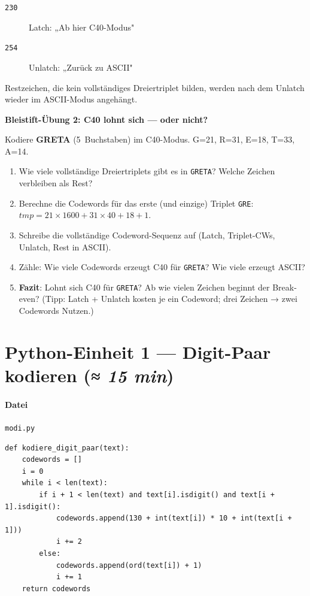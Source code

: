 \begin{description}
\item[\texttt{230}] Latch: „Ab hier C40-Modus"
\item[\texttt{254}] Unlatch: „Zurück zu ASCII"
\end{description}

Restzeichen, die kein vollständiges Dreiertriplet bilden, werden nach
dem Unlatch wieder im ASCII-Modus angehängt.

\begin{bleistiftuebung}
\textbf{Bleistift-Übung 2: C40 lohnt sich — oder nicht?}

Kodiere \textbf{GRETA} (5~Buchstaben) im C40-Modus. G=21, R=31, E=18, T=33, A=14.

\begin{enumerate}[label=\alph*)]
\item Wie viele vollständige Dreiertriplets gibt es in \texttt{GRETA}?
  Welche Zeichen verbleiben als Rest?
\item Berechne die Codewords für das erste (und einzige) Triplet
  \texttt{GRE}: $\mathit{tmp} = 21 \times 1600 + 31 \times 40 + 18 + 1$.
\item Schreibe die vollständige Codeword-Sequenz auf (Latch, Triplet-CWs,
  Unlatch, Rest in ASCII).
\item Zähle: Wie viele Codewords erzeugt C40 für \texttt{GRETA}?
  Wie viele erzeugt ASCII?
\item \textbf{Fazit}: Lohnt sich C40 für \texttt{GRETA}? Ab wie vielen
  Zeichen beginnt der Break-even? (Tipp: Latch + Unlatch kosten je ein
  Codeword; drei Zeichen → zwei Codewords Nutzen.)
\end{enumerate}
\end{bleistiftuebung}

\section{Python-Einheit 1 — Digit-Paar kodieren \normalfont(\textit{≈ 15 min})}

\paragraph{Datei} \texttt{modi.py}

\begin{verbatim}
def kodiere_digit_paar(text):
    codewords = []
    i = 0
    while i < len(text):
        if i + 1 < len(text) and text[i].isdigit() and text[i + 1].isdigit():
            codewords.append(130 + int(text[i]) * 10 + int(text[i + 1]))
            i += 2
        else:
            codewords.append(ord(text[i]) + 1)
            i += 1
    return codewords
\end{verbatim}

